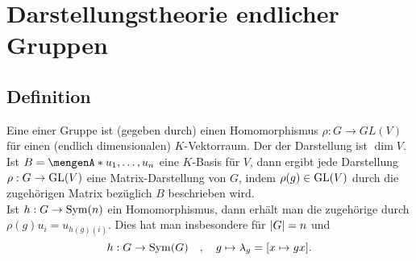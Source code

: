 \section{Darstellungstheorie endlicher Gruppen} %
\label{sec:4}

\subsection[Definition: Darstellung einer Gruppe]{Definition} %
\label{sub:41}
Eine  einer Gruppe ist (gegeben durch) einen Homomorphismus $\rho : G \to GL(V)$ für einen (endlich dimensionalen) $K$-Vektorraum. Der  der 
Darstellung ist $\dim V$. Ist $B = \set{u_1, \ldots , u_n}$ eine $K$-Basis für $V$, dann ergibt jede Darstellung $\rho : G \to \GL(V)$ eine Matrix-Darstellung von $G$,
indem $\rho(g) \in \GL(V)$ durch die zugehörigen Matrix bezüglich $B$ beschrieben wird. \\
Ist $h : G \to \Sym(n)$ ein Homomorphismus, dann erhält man die zugehörige
 durch $\rho(g) u_i = u_{h(g)(i)}$. Dies hat man insbesondere für $\abs*{G}=n$ und 
\[
	h : G \to \Sym(G) \quad , \quad  g \mapsto \lambda_g = [x \mapsto g x].
\]

